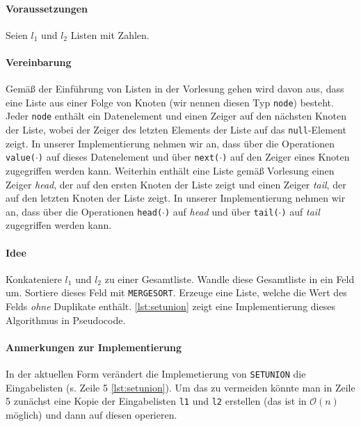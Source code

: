 \documentclass[lang=english, margins=small, listings=true]{scrhmwrk}
\begin{document}
\lstset{language=Pseudocode}


\paragraph{Voraussetzungen}
Seien $l_{1}$ und $l_{2}$ Listen mit Zahlen.

\paragraph{Vereinbarung}
Gemäß der Einführung von Listen in der Vorlesung gehen wird davon aus,
dass eine Liste aus einer Folge von Knoten (wir nennen diesen Typ
\texttt{node}) besteht. Jeder \texttt{node} enthält ein Datenelement
 und einen Zeiger auf den nächsten Knoten der Liste, wobei der Zeiger
 des letzten Elements der Liste auf das \texttt{null}-Element zeigt. In
 unserer Implementierung nehmen wir an, dass über die Operationen \texttt{value($\cdot$)} auf
 dieses Datenelement und über \texttt{next($\cdot$)} auf den Zeiger
 eines Knoten zugegriffen werden kann. Weiterhin enthält eine Liste
 gemäß Vorlesung einen Zeiger \emph{head}, der auf den ersten Knoten
 der Liste zeigt und einen Zeiger \emph{tail}, der auf den letzten
 Knoten der Liste zeigt. In unserer Implementierung nehmen wir an, dass über die Operationen \texttt{head($\cdot$)} auf
 \emph{head} und über \texttt{tail($\cdot$)} auf \emph{tail} zugegriffen werden kann.

\paragraph{Idee} Konkateniere $l_{1}$ und $l_{2}$ zu einer Gesamtliste. Wandle diese Gesamtliste
in ein Feld um. Sortiere dieses Feld mit \texttt{MERGESORT}.
Erzeuge eine Liste, welche die Wert des Felds \emph{ohne} Duplikate
enthält. \autoref{lst:setunion} zeigt eine Implementierung dieses
Algorithmus in Pseudocode.

\paragraph{Anmerkungen zur Implementierung}
In der aktuellen Form verändert die Implemetierung von
\texttt{SETUNION} die Eingabelisten (s. Zeile 5
\autoref{lst:setunion}). Um das zu vermeiden könnte man in Zeile 5 zunächst eine Kopie der Eingabelisten
\texttt{l1} und \texttt{l2} erstellen (das ist in $\mathcal{O}(n)$
möglich) und dann auf diesen operieren.
\end{document}
